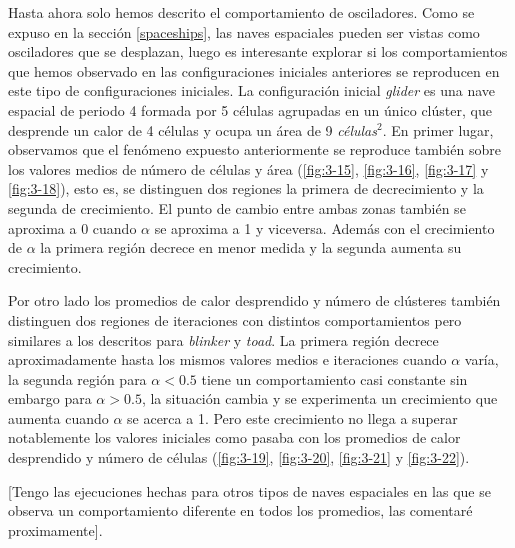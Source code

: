 \documentclass[../proyecto.tex]{memoir}
\begin{document}
Hasta ahora solo hemos descrito el comportamiento de osciladores. Como se expuso en la sección \ref{spaceships}, las naves espaciales pueden ser vistas como osciladores que se desplazan, luego es interesante explorar si los comportamientos que hemos observado en las configuraciones iniciales anteriores se reproducen en este tipo de configuraciones iniciales. La configuración inicial \textit{glider} es una nave espacial de periodo 4 formada por 5 células agrupadas en un único clúster, que desprende un calor de 4 células y ocupa un área de 9 \textit{células}$^2$. En primer lugar, observamos que el fenómeno expuesto anteriormente se reproduce también sobre los valores medios de número de células y área (\autoref{fig:3-15}, \autoref{fig:3-16}, \autoref{fig:3-17} y \autoref{fig:3-18}), esto es, se distinguen dos regiones la primera de decrecimiento y la segunda de crecimiento. El punto de cambio entre ambas zonas también se aproxima a 0 cuando $\alpha$ se aproxima a 1 y viceversa. Además con el crecimiento de $\alpha$ la primera región decrece en menor medida y la segunda aumenta su crecimiento.



Por otro lado los promedios de calor desprendido y número de clústeres también distinguen dos regiones de iteraciones con distintos comportamientos pero similares a los descritos para \textit{blinker} y \textit{toad}. La primera región decrece aproximadamente hasta los mismos valores medios e iteraciones cuando $\alpha$ varía, la segunda región para $\alpha<0.5$ tiene un comportamiento casi constante sin embargo para $\alpha > 0.5$, la situación cambia y se experimenta un crecimiento que aumenta cuando $\alpha$ se acerca a 1. Pero este crecimiento no llega a superar notablemente los valores iniciales como pasaba con los promedios de calor desprendido y número de células (\autoref{fig:3-19}, \autoref{fig:3-20}, \autoref{fig:3-21} y \autoref{fig:3-22}). 


[Tengo las ejecuciones hechas para otros tipos de naves espaciales en las que se observa un comportamiento diferente en todos los promedios, las comentaré proximamente].



\end{document}
